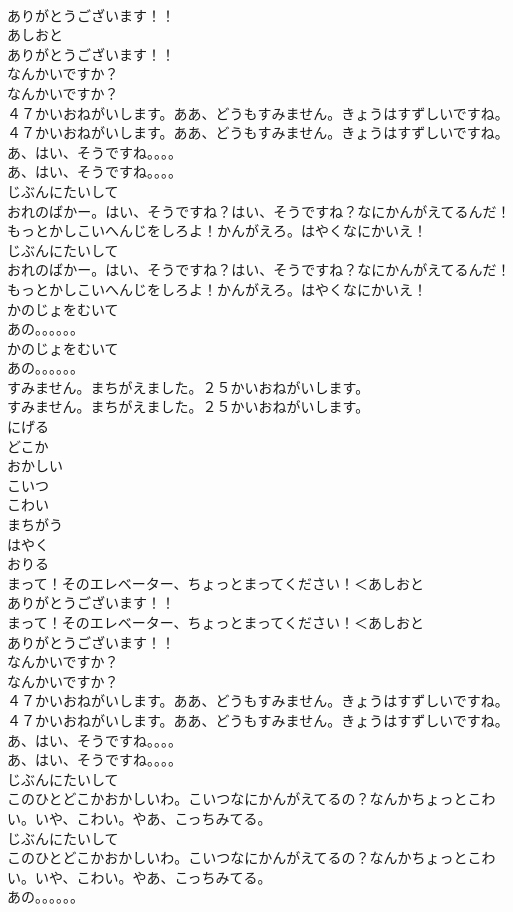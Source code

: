 \documentclass[8pt]{extreport}
\begin{document}
\begin{CJK}{UTF8}{min}
\\	ありがとうございます！！	
\\	あしおと
\\	ありがとうございます！！ 
\\	なんかいですか？	
\\	なんかいですか？ 
\\	４７かいおねがいします。ああ、どうもすみません。きょうはすずしいですね。	
\\	４７かいおねがいします。ああ、どうもすみません。きょうはすずしいですね。 
\\	あ、はい、そうですね。。。。	
\\	あ、はい、そうですね。。。。 
\\	じぶんにたいして
\\	おれのばかー。はい、そうですね？はい、そうですね？なにかんがえてるんだ！もっとかしこいへんじをしろよ！かんがえろ。はやくなにかいえ！	
\\	じぶんにたいして
\\	おれのばかー。はい、そうですね？はい、そうですね？なにかんがえてるんだ！もっとかしこいへんじをしろよ！かんがえろ。はやくなにかいえ！ 
\\	かのじょをむいて
\\	あの。。。。。。	
\\	かのじょをむいて
\\	あの。。。。。。 
\\	すみません。まちがえました。２５かいおねがいします。	
\\	すみません。まちがえました。２５かいおねがいします。 
\\	にげる
\\	どこか
\\	おかしい
\\	こいつ
\\	こわい
\\	まちがう
\\	はやく
\\	おりる
\\	まって！そのエレベーター、ちょっとまってください！＜あしおと
\\	ありがとうございます！！	
\\	まって！そのエレベーター、ちょっとまってください！＜あしおと
\\	ありがとうございます！！ 
\\	なんかいですか？	
\\	なんかいですか？ 
\\	４７かいおねがいします。ああ、どうもすみません。きょうはすずしいですね。	
\\	４７かいおねがいします。ああ、どうもすみません。きょうはすずしいですね。 
\\	あ、はい、そうですね。。。。	
\\	あ、はい、そうですね。。。。 
\\	じぶんにたいして
\\	このひとどこかおかしいわ。こいつなにかんがえてるの？なんかちょっとこわい。いや、こわい。やあ、こっちみてる。	
\\	じぶんにたいして
\\	このひとどこかおかしいわ。こいつなにかんがえてるの？なんかちょっとこわい。いや、こわい。やあ、こっちみてる。 
\\	あの。。。。。。	
\end{CJK}
\end{document}
